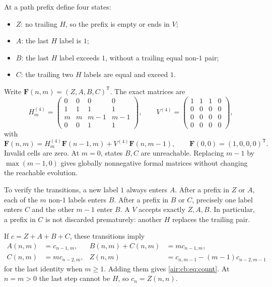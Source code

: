\documentclass[11pt,letterpaper]{article}
\numberwithin{equation}{section}
\theoremstyle{remark}
\begin{document}
At a path prefix define four states:
\begin{itemize}
\item $Z$: no trailing $H$, so the prefix is empty or ends in $V$;
\item $A$: the last $H$ label is $1$;
\item $B$: the last $H$ label exceeds $1$, without a trailing equal non-$1$ pair;
\item $C$: the trailing two $H$ labels are equal and exceed $1$.
\end{itemize}
Write $\mathbf F(n,m)=(Z,A,B,C)^{\mathsf T}$. The exact matrices are
\begin{equation}\label{air:cb:eq:four-state}
H^{(4)}_m=\begin{pmatrix}
0&0&0&0\\1&1&1&1\\m&m&m-1&m-1\\0&0&1&1
\end{pmatrix},\qquad
V^{(4)}=\begin{pmatrix}
1&1&1&0\\0&0&0&0\\0&0&0&0\\0&0&0&0
\end{pmatrix},
\end{equation}
with
\[
\mathbf F(n,m)=H^{(4)}_m\mathbf F(n-1,m)+V^{(4)}\mathbf F(n,m-1),
\qquad \mathbf F(0,0)=(1,0,0,0)^{\mathsf T}.
\]
Invalid cells are zero. At $m=0$, states $B,C$ are unreachable. Replacing
$m-1$ by $\max(m-1,0)$ gives globally nonnegative formal matrices without
changing the reachable evolution.

To verify the transitions, a new label $1$ always enters $A$. After a prefix
in $Z$ or $A$, each of the $m$ non-$1$ labels enters $B$. After a prefix in
$B$ or $C$, precisely one label enters $C$ and the other $m-1$ enter $B$.
A $V$ accepts exactly $Z,A,B$. In particular, a prefix in $C$ is not discarded
prematurely: another $H$ replaces the trailing pair.

If $c=Z+A+B+C$, these transitions imply
\begin{equation}\label{air:cb:eq:state-identities}
\begin{aligned}
A(n,m)&=c_{n-1,m},&
B(n,m)+C(n,m)&=m c_{n-1,m},\\
C(n,m)&=m c_{n-2,m},&
Z(n,m)&=c_{n,m-1}-(m-1)c_{n-2,m-1}
\end{aligned}
\end{equation}
for the last identity when $m\ge1$. Adding them gives \eqref{air:cb:eq:count}.
At $n=m>0$ the last step cannot be $H$, so $c_n=Z(n,n)$.
\end{document}
